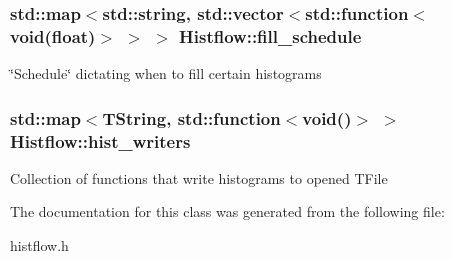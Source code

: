 \subsubsection[{\texorpdfstring{fill\+\_\+schedule}{fill_schedule}}]{\setlength{\rightskip}{0pt plus 5cm}std\+::map$<$std\+::string, std\+::vector$<$std\+::function$<$void(float)$>$ $>$ $>$ Histflow\+::fill\+\_\+schedule\hspace{0.3cm}{\ttfamily [protected]}}\hypertarget{classHistflow_a8440049297c1fc5d0c0f71602a940850}{}\label{classHistflow_a8440049297c1fc5d0c0f71602a940850}
\char`\"{}\+Schedule\char`\"{} dictating when to fill certain histograms 
\subsubsection[{\texorpdfstring{hist\+\_\+writers}{hist_writers}}]{\setlength{\rightskip}{0pt plus 5cm}std\+::map$<$T\+String, std\+::function$<$void()$>$ $>$ Histflow\+::hist\+\_\+writers\hspace{0.3cm}{\ttfamily [protected]}}\hypertarget{classHistflow_ab0e1c8893b1afe8b77c886f6c7c043f4}{}\label{classHistflow_ab0e1c8893b1afe8b77c886f6c7c043f4}
Collection of functions that write histograms to opened T\+File 

The documentation for this class was generated from the following file\+:\begin{DoxyCompactItemize}
\item 
histflow.\+h\end{DoxyCompactItemize}
